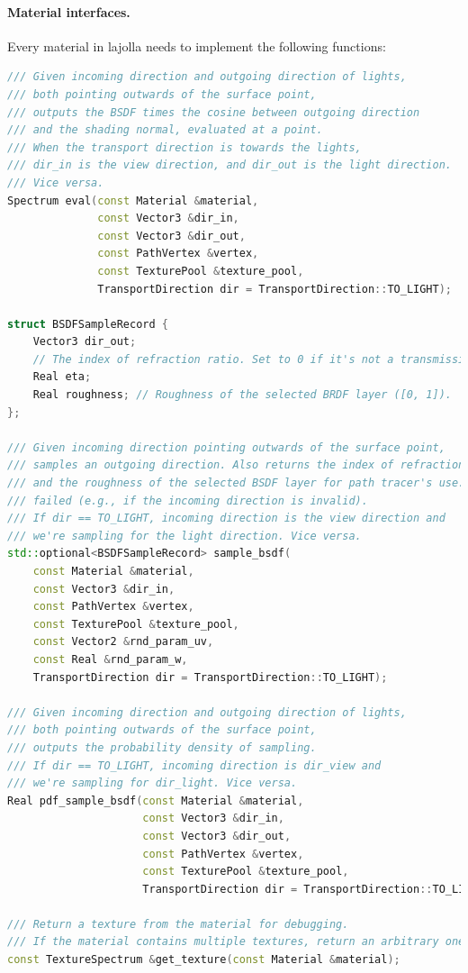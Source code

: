 \documentclass{article}
\begin{document}
\paragraph{Material interfaces.} Every material in lajolla needs to implement the following functions:
\begin{lstlisting}[language=c++]
/// Given incoming direction and outgoing direction of lights,
/// both pointing outwards of the surface point,
/// outputs the BSDF times the cosine between outgoing direction
/// and the shading normal, evaluated at a point.
/// When the transport direction is towards the lights,
/// dir_in is the view direction, and dir_out is the light direction.
/// Vice versa.
Spectrum eval(const Material &material,
              const Vector3 &dir_in,
              const Vector3 &dir_out,
              const PathVertex &vertex,
              const TexturePool &texture_pool,
              TransportDirection dir = TransportDirection::TO_LIGHT);

struct BSDFSampleRecord {
    Vector3 dir_out;
    // The index of refraction ratio. Set to 0 if it's not a transmission event.
    Real eta;
    Real roughness; // Roughness of the selected BRDF layer ([0, 1]).
};

/// Given incoming direction pointing outwards of the surface point,
/// samples an outgoing direction. Also returns the index of refraction
/// and the roughness of the selected BSDF layer for path tracer's use.
/// failed (e.g., if the incoming direction is invalid).
/// If dir == TO_LIGHT, incoming direction is the view direction and 
/// we're sampling for the light direction. Vice versa.
std::optional<BSDFSampleRecord> sample_bsdf(
    const Material &material,
    const Vector3 &dir_in,
    const PathVertex &vertex,
    const TexturePool &texture_pool,
    const Vector2 &rnd_param_uv,
    const Real &rnd_param_w,
    TransportDirection dir = TransportDirection::TO_LIGHT);

/// Given incoming direction and outgoing direction of lights,
/// both pointing outwards of the surface point,
/// outputs the probability density of sampling.
/// If dir == TO_LIGHT, incoming direction is dir_view and 
/// we're sampling for dir_light. Vice versa.
Real pdf_sample_bsdf(const Material &material,
                     const Vector3 &dir_in,
                     const Vector3 &dir_out,
                     const PathVertex &vertex,
                     const TexturePool &texture_pool,
                     TransportDirection dir = TransportDirection::TO_LIGHT);

/// Return a texture from the material for debugging.
/// If the material contains multiple textures, return an arbitrary one.
const TextureSpectrum &get_texture(const Material &material);
\end{lstlisting}
\end{document}
